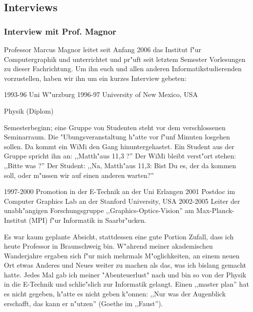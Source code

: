 \subsection{Interviews}
\subsubsection{Interview mit Prof. Magnor}

Professor Marcus Magnor leitet seit Anfang 2006 das Institut f"ur Computergraphik und unterrichtet und pr"uft seit letztem Semester Vorlesungen zu dieser Fachrichtung. Um ihn euch und allen anderen Informatikstudierenden vorzustellen, haben wir ihn um ein kurzes Interview gebeten:



1993-96 Uni W"urzburg 1996-97 University of New Mexico, USA


Physik (Diplom)


Semesterbeginn; eine Gruppe von Studenten steht vor dem verschlossenen Seminarraum. Die "Ubungsveranstaltung h"atte vor f"unf Minuten losgehen sollen. Da kommt ein WiMi den Gang hinuntergehastet. Ein Student aus der Gruppe spricht ihn an: ,,Matth"aus 11,3 ?'' Der WiMi bleibt verst"ort stehen: ,,Bitte was ?'' Der Student: ,,Na, Matth"aus 11,3: Bist Du es, der da kommen soll, oder m"ussen wir auf einen anderen warten?''


1997-2000 Promotion in der E-Technik an der Uni Erlangen
2001 Postdoc im Computer Graphics Lab an der Stanford University, USA
2002-2005 Leiter der unabh"angigen Forschungsgruppe
,,Graphics-Optics-Vision'' am Max-Planck-Institut (MPI) f"ur Informatik in Saarbr"ucken.


Es war kaum geplante Absicht, stattdessen eine gute Portion Zufall, dass ich heute Professor in Braunschweig bin. W"ahrend meiner akademischen Wanderjahre ergaben sich f"ur mich mehrmals M"oglichkeiten, an einem neuen Ort etwas Anderes und Neues weiter zu machen als das, was ich bislang gemacht hatte. Jedes Mal gab ich meiner "Abenteuerlust" nach und bin so von der Physik in die E-Technik und schlie"slich zur Informatik gelangt. Einen ,,master plan'' hat es nicht gegeben, h"atte es nicht geben k"onnen: ,,Nur was der Augenblick erschafft, das kann er n"utzen'' (Goethe im ,,Faust'').

